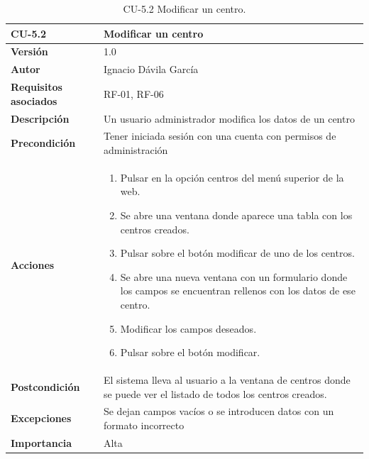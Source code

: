 \begin{table}[p]
	\centering
	\begin{tabularx}{\linewidth}{ p{} p{} }
		\toprule
		\textbf{CU-5.2}    & \textbf{Modificar un centro}\\
		\toprule
		\textbf{Versión}              & 1.0    \\
		\textbf{Autor}                & Ignacio Dávila García \\
		\textbf{Requisitos asociados} & RF-01, RF-06 \\
		\textbf{Descripción}          & Un usuario administrador modifica los datos de un centro \\
		\textbf{Precondición}         & Tener iniciada sesión con una cuenta con permisos de administración \\
		\textbf{Acciones}             &
		\begin{enumerate}
			\def\labelenumi{\arabic{enumi}.}
			\tightlist
			\item Pulsar en la opción centros del menú superior de la web.
			\item Se abre una ventana donde aparece una tabla con los centros creados.
			\item Pulsar sobre el botón modificar de uno de los centros.
			\item Se abre una nueva ventana con un formulario donde los campos se encuentran rellenos con los datos de ese centro.
			\item Modificar los campos deseados.
			\item Pulsar sobre el botón modificar.
		\end{enumerate}\\
		\textbf{Postcondición}        & El sistema lleva al usuario a la ventana de centros donde se puede ver el listado de todos los centros creados. \\
		\textbf{Excepciones}          & Se dejan campos vacíos o se introducen datos con un formato incorrecto \\
		\textbf{Importancia}          & Alta \\
		\bottomrule
	\end{tabularx}
	\caption{CU-5.2 Modificar un centro.}
\end{table}

